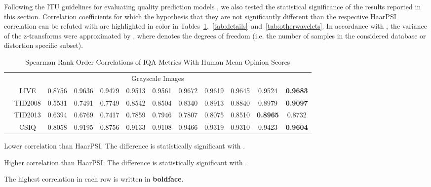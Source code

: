 \documentclass[11pt,a4paper]{article}
\begin{document}
Following the ITU guidelines for evaluating quality prediction models \cite{ITUTP1401}, we also tested the statistical significance of the results reported in this section. Correlation coefficients for which the  hypothesis that they are not significantly different than the respective HaarPSI correlation can be refuted with  are highlighted in color in Tables~\ref{tab:sroccdatabases},~\ref{tab:details}~and~\ref{tab:otherwavelets}. In accordance with \cite{fieller1957tests}, the variance of the z-transforms were approximated by , where  denotes the degrees of freedom (i.e. the number of samples in the considered database or distortion specific subset).


\setlength{\tabcolsep}{2mm}
\begin{table}[!htb]
	\centering
	\caption{Spearman Rank Order Correlations of IQA Metrics With Human Mean Opinion Scores}
	\label{tab:sroccdatabases}	
	\begin{threeparttable}
		\begin{scriptsize}
			\begin{tabular}{*{12}{c}}
				\toprule[0.5mm]
				\multicolumn{12}{c}{Grayscale Images}\0.1cm]
				& & PSNR & VIF & SSIM & MS-SSIM & GSM & MAD & SR-SIM & FSIM & VSI & HaarPSI\\
				& LIVE & \cellcolor{green!25}0.8756 & 0.9636 & \cellcolor{green!25}0.9479 & \cellcolor{green!25}0.9513 & \cellcolor{green!25}0.9561 & 0.9672 & 0.9619 & 0.9645 & \cellcolor{green!25}0.9524 & \textbf{0.9683}\\
				& TID2008 & \cellcolor{green!25}0.5531 & \cellcolor{green!25}0.7491 & \cellcolor{green!25}0.7749 & \cellcolor{green!25}0.8542 & \cellcolor{green!25}0.8504 & \cellcolor{green!25}0.8340 & \cellcolor{green!25}0.8913 & \cellcolor{green!25}0.8840 & 0.8979 & \textbf{0.9097}\\
				& TID2013 & \cellcolor{green!25}0.6394 & \cellcolor{green!25}0.6769 & \cellcolor{green!25}0.7417 & \cellcolor{green!25}0.7859 & \cellcolor{green!25}0.7946 & \cellcolor{green!25}0.7807 & \cellcolor{green!25}0.8075 & \cellcolor{green!25}0.8510 & \cellcolor{red!25}\textbf{0.8965} & 0.8732\\
				& CSIQ & \cellcolor{green!25}0.8058 & \cellcolor{green!25}0.9195 & \cellcolor{green!25}0.8756 & \cellcolor{green!25}0.9133 & \cellcolor{green!25}0.9108 & \cellcolor{green!25}0.9466 & \cellcolor{green!25}0.9319 & \cellcolor{green!25}0.9310 & \cellcolor{green!25}0.9423 & \textbf{0.9604}\\\midrule[0.5mm]
			\end{tabular}
			\begin{tablenotes}
				\item \colorbox{green!25}{Lower correlation than HaarPSI. The difference is statistically significant with .}
				\item \colorbox{red!25}{Higher correlation than HaarPSI. The difference is statistically significant with .}
				\item The highest correlation in each row is written in \textbf{boldface}.
			\end{tablenotes}
	\end{scriptsize}
\end{threeparttable}
\end{table}
\end{document}
